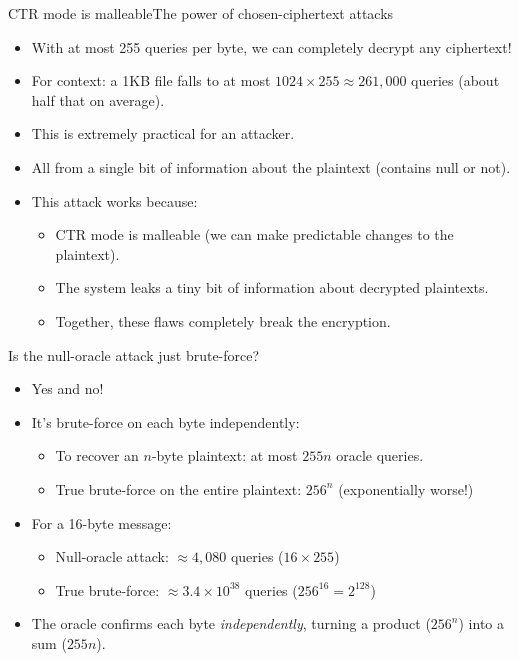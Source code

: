 \ifdefined\PRESENTATION\else\PassOptionsToClass{handout}{beamer}\fi\documentclass[aspectratio=169, lualatex]{beamer}
\begin{document}
\begin{frame}{CTR mode is malleable}{The power of chosen-ciphertext attacks}
	\begin{itemize}
		\item With at most 255 queries per byte, we can completely decrypt any ciphertext!
		\item For context: a 1KB file falls to at most $1024 \times 255 \approx 261{,}000$ queries (about half that on average).
		\item This is extremely practical for an attacker.
		\item All from a single bit of information about the plaintext (contains null or not).
		\item This attack works because:
		      \begin{itemize}
			      \item CTR mode is malleable (we can make predictable changes to the plaintext).
			      \item The system leaks a tiny bit of information about decrypted plaintexts.
			      \item Together, these flaws completely break the encryption.
		      \end{itemize}
	\end{itemize}
\end{frame}

\begin{frame}{Is the null-oracle attack just brute-force?}
	\begin{itemize}
		\item Yes and no!
		\item It's brute-force on each byte independently:
		      \begin{itemize}
			      \item To recover an $n$-byte plaintext: at most $255n$ oracle queries.
			      \item True brute-force on the entire plaintext: $256^n$ (exponentially worse!)
		      \end{itemize}
		\item For a 16-byte message:
		      \begin{itemize}
			      \item Null-oracle attack: $\approx 4{,}080$ queries ($16 \times 255$)
			      \item True brute-force: $\approx 3.4 \times 10^{38}$ queries ($256^{16} = 2^{128}$)
		      \end{itemize}
		\item The oracle confirms each byte \emph{independently}, turning a product ($256^n$) into a sum ($255 n$).
	\end{itemize}
\end{frame}
\end{document}

